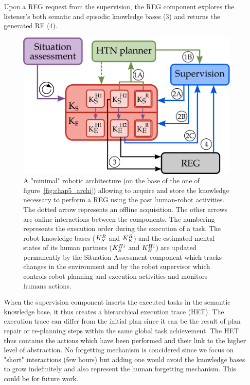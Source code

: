 Upon a REG request from the supervision, the REG component explores the listener's both sematic and episodic knowledge bases (3) and returns the generated RE (4).

\begin{figure}[h!]
\centering
\includegraphics[scale=0.35]{figures/chapter6/architecture.png}
\caption{\label{fig:chap6_architecture} A "minimal" robotic architecture (on the base of the one of figure~\ref{fig:chap5_archi}) allowing to acquire and store the knowledge necessary to perform a REG using the past human-robot activities. The dotted arrow represents an offline acquisition. The other arrows are online interactions between the components. The numbering represents the execution order during the execution of a task.
The robot knowledge bases ($K_S^{R}$ and $K_E^{R}$) and the estimated mental states of its human partners ($K_S^{Hi}$ and $K_E^{Hi}$) are updated permanently by the Situation Assessment component which tracks changes in the environment and by the robot supervisor which controls robot planning and execution activities and monitors humans actions.}
\end{figure}

When the supervision component inserts the executed tasks in the semantic knowledge base, it thus creates a hierarchical execution trace (HET). The execution trace can differ from the initial plan since it can be the result of plan repair or re-planning steps within the same global task achievement. The HET thus contains the actions which have been performed and their link to the higher level of abstraction. No forgetting mechanism is concidered since we focus on "short" interactions (few hours) but adding one would avoid the knowledge bases to grow indefinitely and also represent the human forgetting mechanism. This could be for future work.

